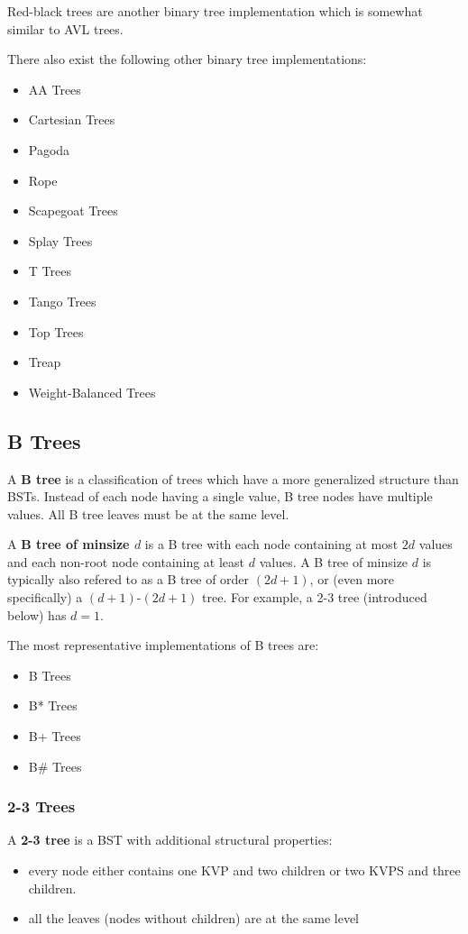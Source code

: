 \documentclass[12pt]{article}
\begin{document}
Red-black trees are another binary tree implementation which is somewhat similar to AVL trees.

There also exist the following other binary tree implementations:
\begin{itemize}
\item AA Trees
\item Cartesian Trees
\item Pagoda
\item Rope
\item Scapegoat Trees
\item Splay Trees
\item T Trees
\item Tango Trees
\item Top Trees
\item Treap
\item Weight-Balanced Trees
\end{itemize}

\subsection{B Trees}
A {\bf B tree} is a classification of trees which have a more generalized structure than BSTs. Instead of each node having a single value, B tree nodes have multiple values. All B tree leaves must be at the same level.

A {\bf B tree of minsize $d$} is a B tree with each node containing at most $2d$ values and each non-root node containing at least $d$ values. A B tree of minsize $d$ is typically also refered to as a B tree of order $(2d+1)$, or (even more specifically) a $(d+1)$-$(2d+1)$ tree. For example, a 2-3 tree (introduced below) has $d = 1$.

The most representative implementations of B trees are:
\begin{itemize}
\item B Trees
\item B* Trees
\item B+ Trees
\item B\# Trees
\end{itemize}

\subsubsection{2-3 Trees}
A {\bf 2-3 tree} is a BST with additional structural properties:
\begin{itemize}
\item every node either contains one KVP and two children or two KVPS and three children.
\item all the leaves (nodes without children) are at the same level
\end{itemize}
\end{document}
